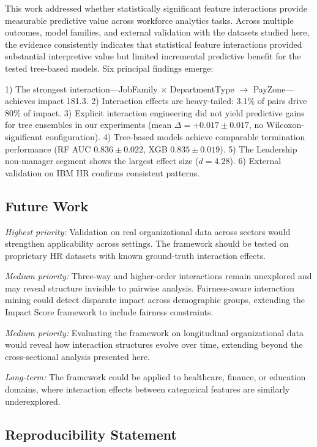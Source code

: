 \documentclass[conference]{IEEEtran}
\begin{document}
This work addressed whether statistically significant feature interactions provide measurable predictive value across workforce analytics tasks. Across multiple outcomes, model families, and external validation with the datasets studied here, the evidence consistently indicates that statistical feature interactions provided substantial interpretive value but limited incremental predictive benefit for the tested tree-based models. Six principal findings emerge:

1) The strongest interaction---JobFamily $\times$ DepartmentType $\to$ PayZone---achieves impact 181.3.
2) Interaction effects are heavy-tailed: 3.1\% of pairs drive 80\% of impact.    3) Explicit interaction engineering did not yield predictive gains for tree ensembles in our experiments (mean $\Delta = +0.017\pm0.017$, no Wilcoxon-significant configuration).
4) Tree-based models achieve comparable termination performance (RF AUC $0.836\pm0.022$, XGB $0.835\pm0.019$).
5) The Leadership non-manager segment shows the largest effect size ($d = 4.28$).
6) External validation on IBM HR confirms consistent patterns.

\subsection{Future Work}

\textit{Highest priority:} Validation on real organizational data across sectors would strengthen applicability across settings. The framework should be tested on proprietary HR datasets with known ground-truth interaction effects.

\textit{Medium priority:} Three-way and higher-order interactions remain unexplored and may reveal structure invisible to pairwise analysis. Fairness-aware interaction mining could detect disparate impact across demographic groups, extending the Impact Score framework to include fairness constraints.

\textit{Medium priority:} Evaluating the framework on longitudinal organizational data would reveal how interaction structures evolve over time, extending beyond the cross-sectional analysis presented here.

\textit{Long-term:} The framework could be applied to healthcare, finance, or education domains, where interaction effects between categorical features are similarly underexplored.

\subsection*{Reproducibility Statement}
\end{document}
